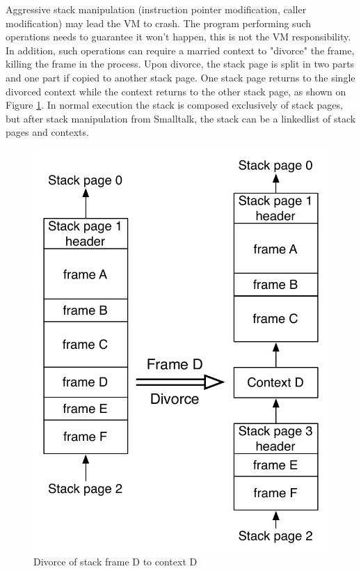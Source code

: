 \documentclass[a4paper,12pt,twoside]{../includes/ThesisStyle}
\begin{document}
Aggressive stack manipulation (instruction pointer modification, caller modification) may lead the VM to crash. The program performing such operations needs to guarantee it won't happen, this is not the VM responsibility. In addition, such operations can require a married context to "divorce" the frame, killing the frame in the process. Upon divorce, the stack page is split in two parts and one part if copied to another stack page. One stack page returns to the single divorced context while the context returns to the other stack page, as shown on Figure \ref{fig:Divorce}. In normal execution the stack is composed exclusively of stack pages, but after stack manipulation from Smalltalk, the stack can be a linkedlist of stack pages and contexts. 

\begin{figure}[h!]
    \begin{center}
        \includegraphics[width=0.55\linewidth]{Divorce}
        \caption{Divorce of stack frame D to context D}
        \label{fig:Divorce}
    \end{center}
\end{figure}

\end{document}
